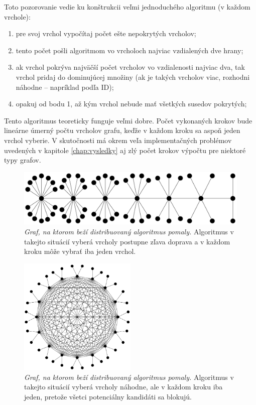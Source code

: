 Toto pozorovanie vedie ku konštrukcii veľmi jednoduchého algoritmu (v každom 
vrchole):

\begin{enumerate}
	\item pre svoj vrchol vypočítaj počet ešte nepokrytých vrcholov;
	\item tento počet pošli algoritmom vo vrcholoch najviac vzdialených dve 
		hrany;
	\item ak vrchol pokrýva najväčší počet vrcholov vo vzdialenosti najviac 
		dva, tak vrchol pridaj do dominujúcej množiny (ak je takých vrcholov 
		viac, rozhodni náhodne -- napríklad podľa ID);
	\item opakuj od bodu 1, až kým vrchol nebude mať všetkých susedov 
		pokrytých;
\end{enumerate}

Tento algoritmus teoreticky funguje veľmi dobre. Počet vykonaných krokov bude 
lineárne úmerný počtu vrcholov grafu, keďže v každom kroku sa aspoň jeden 
vrchol vyberie. V skutočnosti má okrem veľa implementačných problémov uvedených 
v kapitole \ref{chap:vysledky} aj zlý počet krokov výpočtu pre niektoré typy 
grafov.

\begin{figure}
	\centering
	\includegraphics[width=1.0\textwidth]{obrazky/zle1}
	\caption{\emph{Graf, na ktorom beží distribuovaný algoritmus pomaly.} 
		Algoritmus v takejto situácií vyberá vrcholy postupne zľava doprava 
		a v každom kroku môže vybrať iba jeden vrchol.}
	\label{img:zle1}
\end{figure}

\begin{figure}
	\centering
	\includegraphics[width=0.5\textwidth]{obrazky/zle2}
	\caption{\emph{Graf, na ktorom beží distribuovaný algoritmus pomaly.} 
		Algoritmus v takejto situácií vyberá vrcholy náhodne, ale v každom 
		kroku iba jeden, pretože všetci potenciálny kandidáti sa blokujú.}
	\label{img:zle2}
\end{figure}


